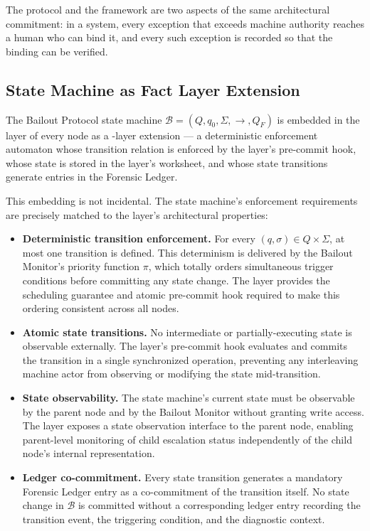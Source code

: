 The protocol and the framework are two aspects of the same architectural commitment: in a \bxthree{} system, every exception that exceeds machine authority reaches a human who can bind it, and every such exception is recorded so that the binding can be verified.

\subsection{State Machine as Fact Layer Extension}\label{sec:state-machine-fact-layer}

The Bailout Protocol state machine $\mathcal{B}=(Q,q_0,\Sigma,\rightarrow,Q_F)$ is embedded in the \fact{} layer of every \bxthree{} node as a \fact-layer extension — a deterministic enforcement automaton whose transition relation is enforced by the \fact{} layer's pre-commit hook, whose state is stored in the \fact{} layer's worksheet, and whose state transitions generate entries in the Forensic Ledger.

This embedding is not incidental. The state machine's enforcement requirements are precisely matched to the \fact{} layer's architectural properties:

\begin{itemize}\itemsep=0pt
\item[(\textit{i})] \textbf{Deterministic transition enforcement.} For every $(q,\sigma)\in Q\times\Sigma$, at most one transition is defined. This determinism is delivered by the Bailout Monitor's priority function $\pi$, which totally orders simultaneous trigger conditions before committing any state change. The \fact{} layer provides the scheduling guarantee and atomic pre-commit hook required to make this ordering consistent across all nodes.

\item[(\textit{ii})] \textbf{Atomic state transitions.} No intermediate or partially-executing state is observable externally. The \fact{} layer's pre-commit hook evaluates and commits the transition in a single synchronized operation, preventing any interleaving machine actor from observing or modifying the state mid-transition.

\item[(\textit{iii})] \textbf{State observability.} The state machine's current state must be observable by the parent node and by the Bailout Monitor without granting write access. The \fact{} layer exposes a state observation interface to the parent node, enabling parent-level monitoring of child escalation status independently of the child node's internal representation.

\item[(\textit{iv})] \textbf{Ledger co-commitment.} Every state transition generates a mandatory Forensic Ledger entry as a co-commitment of the transition itself. No state change in $\mathcal{B}$ is committed without a corresponding ledger entry recording the transition event, the triggering condition, and the diagnostic context.
\end{itemize}

